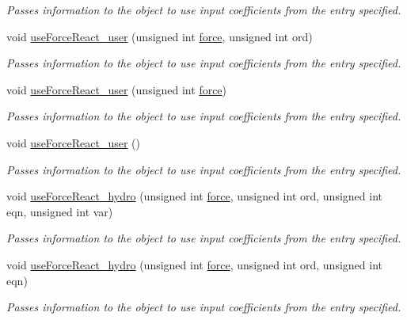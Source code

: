 \begin{DoxyCompactItemize}
\begin{DoxyCompactList}\small\item\em Passes information to the object to use input coefficients from the entry specified. \end{DoxyCompactList}\item 
void \hyperlink{classosea_1_1ofreq_1_1_motion_model_afa99c39f1018471c2ce0793f5de6987b}{use\-Force\-React\-\_\-user} (unsigned int \hyperlink{input__syntax_8dox_ab0a92c70357da47fe86696522eab7dc8}{force}, unsigned int ord)
\begin{DoxyCompactList}\small\item\em Passes information to the object to use input coefficients from the entry specified. \end{DoxyCompactList}\item 
void \hyperlink{classosea_1_1ofreq_1_1_motion_model_a805e8c1ff2fdb767543011b093ec8e86}{use\-Force\-React\-\_\-user} (unsigned int \hyperlink{input__syntax_8dox_ab0a92c70357da47fe86696522eab7dc8}{force})
\begin{DoxyCompactList}\small\item\em Passes information to the object to use input coefficients from the entry specified. \end{DoxyCompactList}\item 
void \hyperlink{classosea_1_1ofreq_1_1_motion_model_a6d362d62468bacc57f5be5efe27deb4a}{use\-Force\-React\-\_\-user} ()
\begin{DoxyCompactList}\small\item\em Passes information to the object to use input coefficients from the entry specified. \end{DoxyCompactList}\item 
void \hyperlink{classosea_1_1ofreq_1_1_motion_model_ae3d2c7527ea2daddc6a85b6e02febb45}{use\-Force\-React\-\_\-hydro} (unsigned int \hyperlink{input__syntax_8dox_ab0a92c70357da47fe86696522eab7dc8}{force}, unsigned int ord, unsigned int eqn, unsigned int var)
\begin{DoxyCompactList}\small\item\em Passes information to the object to use input coefficients from the entry specified. \end{DoxyCompactList}\item 
void \hyperlink{classosea_1_1ofreq_1_1_motion_model_a95f023bebf06d16a31b7b493a46c3ba3}{use\-Force\-React\-\_\-hydro} (unsigned int \hyperlink{input__syntax_8dox_ab0a92c70357da47fe86696522eab7dc8}{force}, unsigned int ord, unsigned int eqn)
\begin{DoxyCompactList}\small\item\em Passes information to the object to use input coefficients from the entry specified. \end{DoxyCompactList}\item 

\end{DoxyCompactItemize}
